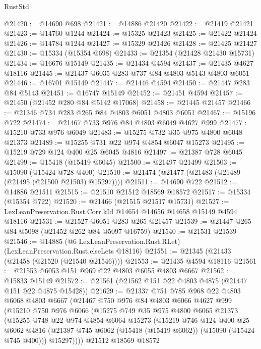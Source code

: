 \begin{lexlean}{RustStd}
\begin{coremodule}
@21420 := @14690 @698
@21421 := @14886 @21420
@21422 := @21419 @21421
@21423 := @14760 @1244
@21424 := @15325 @21423
@21425 := @21422 @21424
@21426 := @14784 @1244
@21427 := @15329 @21426
@21428 := @21425 @21427
@21430 := @15334 (@15354 @698)
@21433 := @21354 (@21428 @21430 @15731)
@21434 := @16676 @15149
@21435 := @21434 @4594
@21437 := @21435 @4627 @18116
@21445 := @21437 @6035 @283 @737 @84 @4803 @5143 @4803 @6051
@21446 := @16701 @15149
@21447 := @21446 @4594
@21450 := @21447 @283 @84 @5143
@21451 := @16747 @15149
@21452 := @21451 @4594
@21457 := @21450 (@21452 @280 @84 @5142 @17068)
@21458 := @21445 @21457
@21466 := @21346 @734 @283 @265 @84 @4803 @6051 @4803 @6051
@21467 := @15196 @722
@21474 := @21467 @733 @976 @84 @4803 @6049 @4627 @999
@21477 := @15210 @733 @976 @6049
@21483 := @15275 @732 @35 @975 @4800 @6048 @21373
@21489 := @15255 @731 @22 @974 @4854 @6047 @15273
@21495 := @15219 @729 @124 @400 @25 @6045 @4816
@21497 := @21387 @728 @6045
@21499 := @15418 (@15419 @6045)
@21500 := @21497 @21499
@21503 := @15090 (@15424 @728 @400)
@21510 := @21474 (@21477 (@21483 (@21489 (@21495 (@21500 @21503) @15297))))
@21511 := @14690 @722
@21512 := @14886 @21511
@21515 := @21510 @21512 @18569 @18572
@21517 := @15334 (@15354 @722)
@21520 := @21466 (@21515 @21517 @15731)
@21527 := LexLeanPreservation.Rust.Corr.kId @14654 @14656 @14658 @15149 @4594 @18116
@21531 := @21527 @6051 @283 @265 @21457
@21539 := @21447 @265 @84 @5098 (@21452 @262 @84 @5097 @16759)
@21540 := @21531 @21539
@21546 := @14885 (@6 LexLeanPreservation.Rust.RLet) (LexLeanPreservation.Rust.elseLets @18116)
@21551 := @21345 (@21433 (@21458 (@21520 (@21540 @21546))))
@21553 := @21435 @4594 @18116
@21561 := @21553 @6053 @151 @969 @22 @4803 @6055 @4803 @6667
@21562 := @15833 @15149
@21572 := @21561 (@21562 @151 @22 @4803 @4875 (@21447 @151 @22 @4875 @15428))
@21629 := @21337
    @751
    @785
    @968
    @22
    @4803
    @6068
    @4803
    @6667
    (@21467
      @750
      @976
      @84
      @4803
      @6066
      @4627
      @999
      (@15210
        @750
        @976
        @6066
        (@15275
          @749
          @35
          @975
          @4800
          @6065
          @21373
          (@15255
            @748
            @22
            @974
            @4854
            @6064
            @15273
            (@15219
              @746
              @124
              @400
              @25
              @6062
              @4816
              (@21387 @745 @6062 (@15418 (@15419 @6062)) (@15090 (@15424 @745 @400)))
              @15297))))
      @21512
      @18569
      @18572

\end{coremodule}
\end{lexlean}

